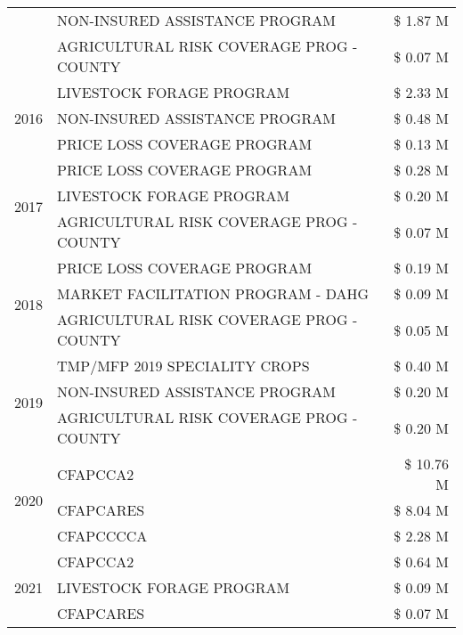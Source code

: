 \begin{tabular}{llr}
 & NON-INSURED ASSISTANCE PROGRAM & \$ 1.87 M \\
 & AGRICULTURAL RISK COVERAGE PROG - COUNTY & \$ 0.07 M \\
\cline{1-3}
\multirow[t]{3}{*}{2016} & LIVESTOCK FORAGE PROGRAM                      & \$ 2.33 M \\
 & NON-INSURED ASSISTANCE PROGRAM                & \$ 0.48 M \\
 & PRICE LOSS COVERAGE PROGRAM                   & \$ 0.13 M \\
\cline{1-3}
\multirow[t]{3}{*}{2017} & PRICE LOSS COVERAGE PROGRAM & \$ 0.28 M \\
 & LIVESTOCK FORAGE PROGRAM & \$ 0.20 M \\
 & AGRICULTURAL RISK COVERAGE PROG - COUNTY & \$ 0.07 M \\
\cline{1-3}
\multirow[t]{3}{*}{2018} & PRICE LOSS COVERAGE PROGRAM & \$ 0.19 M \\
 & MARKET FACILITATION PROGRAM - DAHG & \$ 0.09 M \\
 & AGRICULTURAL RISK COVERAGE PROG - COUNTY & \$ 0.05 M \\
\cline{1-3}
\multirow[t]{3}{*}{2019} & TMP/MFP 2019 SPECIALITY CROPS & \$ 0.40 M \\
 & NON-INSURED ASSISTANCE PROGRAM & \$ 0.20 M \\
 & AGRICULTURAL RISK COVERAGE PROG - COUNTY & \$ 0.20 M \\
\cline{1-3}
\multirow[t]{3}{*}{2020} & CFAPCCA2 & \$ 10.76 M \\
 & CFAPCARES & \$ 8.04 M \\
 & CFAPCCCCA & \$ 2.28 M \\
\cline{1-3}
\multirow[t]{3}{*}{2021} & CFAPCCA2 & \$ 0.64 M \\
 & LIVESTOCK FORAGE PROGRAM & \$ 0.09 M \\
 & CFAPCARES & \$ 0.07 M \\
\cline{1-3}
\bottomrule
\end{tabular}
